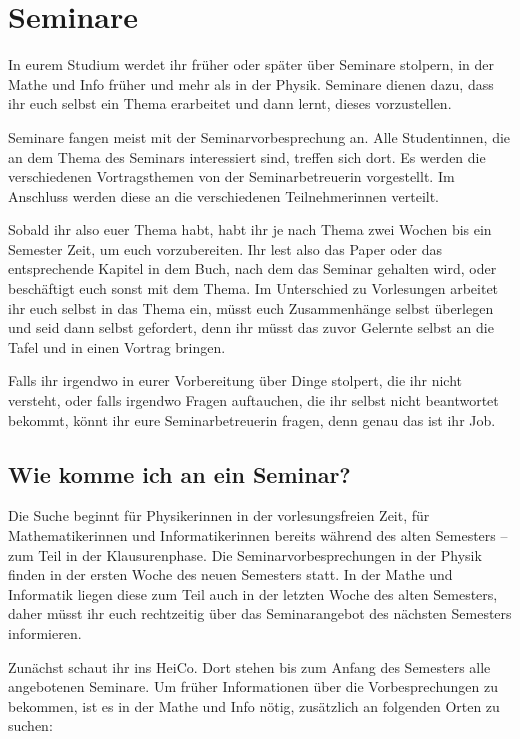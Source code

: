 \section{Seminare}

In eurem Studium werdet ihr früher oder später über Seminare stolpern, in der Mathe und Info früher und mehr als in der Physik. Seminare dienen dazu, dass ihr euch selbst ein Thema erarbeitet und dann lernt, dieses vorzustellen.

Seminare fangen meist mit der Seminarvorbesprechung an. Alle Studentinnen, die an dem Thema des Seminars interessiert sind, treffen sich dort. Es werden die verschiedenen Vortragsthemen von der Seminarbetreuerin vorgestellt. Im Anschluss werden diese an die verschiedenen Teilnehmerinnen verteilt.

Sobald ihr also euer Thema habt, habt ihr je nach Thema zwei Wochen bis ein Semester Zeit, um euch vorzubereiten. Ihr lest also das Paper oder das entsprechende Kapitel in dem Buch, nach dem das Seminar gehalten wird, oder beschäftigt euch sonst mit dem Thema. Im Unterschied zu Vorlesungen arbeitet ihr euch selbst in das Thema ein, müsst euch Zusammenhänge selbst überlegen und seid dann selbst gefordert, denn ihr müsst das zuvor Gelernte selbst an die Tafel und in einen Vortrag bringen.

Falls ihr irgendwo in eurer Vorbereitung über Dinge stolpert, die ihr nicht versteht, oder falls irgendwo Fragen auftauchen, die ihr selbst nicht beantwortet bekommt, könnt ihr eure Seminarbetreuerin fragen, denn genau das ist ihr Job.

\subsection{Wie komme ich an ein Seminar?}

Die Suche beginnt für Physikerinnen in der vorlesungsfreien Zeit, für Mathematikerinnen und Informatikerinnen bereits während des alten Semesters -- zum Teil in der Klausurenphase. Die Seminarvorbesprechungen in der Physik finden in der ersten Woche des neuen Semesters statt. In der Mathe und Informatik liegen diese zum Teil auch in der letzten Woche des alten Semesters, daher müsst ihr euch rechtzeitig über das Seminarangebot des nächsten Semesters informieren.

Zunächst schaut ihr ins HeiCo. Dort stehen bis zum Anfang des Semesters alle angebotenen Seminare. Um früher Informationen über die Vorbesprechungen zu bekommen, ist es in der Mathe und Info nötig, zusätzlich an folgenden Orten zu suchen:

